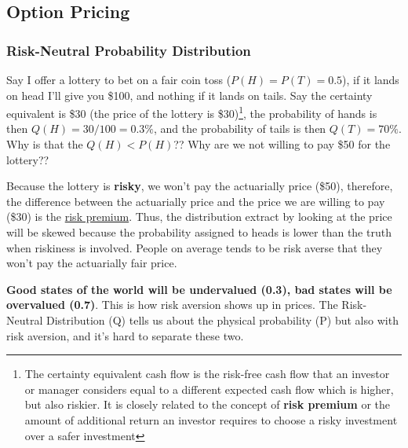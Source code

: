 \begin{multicols}{2}
\subsection{Option Pricing}
\subsubsection{Risk-Neutral Probability Distribution}
Say I offer a lottery to bet on a fair coin toss ($P(H)=P(T)=0.5$), if it lands on head I'll give you \$100, and nothing if it lands on tails. Say the certainty equivalent is \$30 (the price of the lottery is \$30)\footnote{The certainty equivalent cash flow is the risk-free cash flow that an investor or manager considers equal to a different expected cash flow which is higher, but also riskier. It is closely related to the concept of \textbf{risk premium} or the amount of additional return an investor requires to choose a risky investment over a safer investment}, the probability of hands is then $Q(H)=30/100 = 0.3\%$, and the probability of tails is then $Q(T) = 70\%$. Why is that the $Q(H)<P(H)$?? Why are we not willing to pay \$50 for the lottery??\par 

Because the lottery is \textbf{risky}, we won't pay the actuarially price (\$50), therefore, the difference between the actuarially price and the price we are willing to pay (\$30) is the \underline{risk premium}. Thus, the distribution extract by looking at the price will be skewed because the probability assigned to heads is lower than the truth when riskiness is involved. People on average tends to be risk averse that they won't pay the actuarially fair price.\par 

\textbf{Good states of the world will be undervalued (0.3), bad states will be overvalued (0.7)}. This is how risk aversion shows up in prices. The Risk-Neutral Distribution (Q) tells us about the physical probability (P) but also with risk aversion, and it's hard to separate these two. 


\end{multicols}
